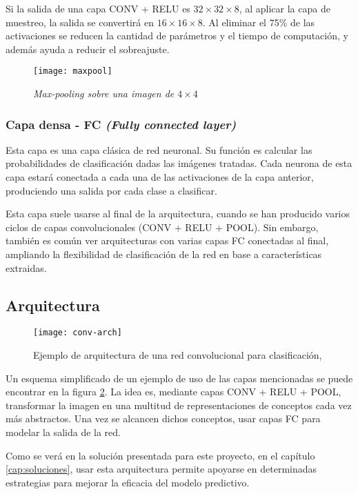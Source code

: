 Si la salida de una capa CONV + RELU es $32 \times 32 \times 8$, al aplicar la capa de muestreo, la salida se convertirá en $16 \times 16 \times 8$. Al eliminar el 75\% de las activaciones se reducen la cantidad de parámetros y el tiempo de computación, y además ayuda a reducir el sobreajuste.

\begin{figure}
    \centering
    \caption{\textit{Max-pooling sobre una imagen de $4\times4$}}
  \label{maxpool}
  \texttt{[image: maxpool]}
\end{figure}

\subsubsection{Capa densa - FC \textit{(Fully connected layer)}}

Esta capa es una capa clásica de red neuronal. Su función es calcular las probabilidades de clasificación dadas las imágenes tratadas. Cada neurona de esta capa estará conectada a cada una de las activaciones de la capa anterior, produciendo una salida por cada clase a clasificar.

Esta capa suele usarse al final de la arquitectura, cuando se han producido varios ciclos de capas convolucionales (CONV + RELU + POOL). Sin embargo, también es común ver arquitecturas con varias capas FC conectadas al final, ampliando la flexibilidad de clasificación de la red en base a características extraidas.

\subsection{Arquitectura}
\label{sec:conv-net-arch}

\begin{figure}
    \centering
    \caption{Ejemplo de arquitectura de una red convolucional para clasificación, \parencite{clarifai}}
\label{conv-arch}
  \texttt{[image: conv-arch]}
\end{figure}

Un esquema simplificado de un ejemplo de uso de las capas mencionadas se puede encontrar en la figura \ref{conv-arch}. La idea es, mediante capas CONV + RELU + POOL, transformar la imagen en una multitud de representaciones de conceptos cada vez más abstractos. Una vez se alcancen dichos conceptos, usar capas FC para modelar la salida de la red.

Como se verá en la solución presentada para este proyecto, en el capítulo \ref{cap:soluciones}, usar esta arquitectura permite apoyarse en determinadas estrategias para mejorar la eficacia del modelo predictivo.
